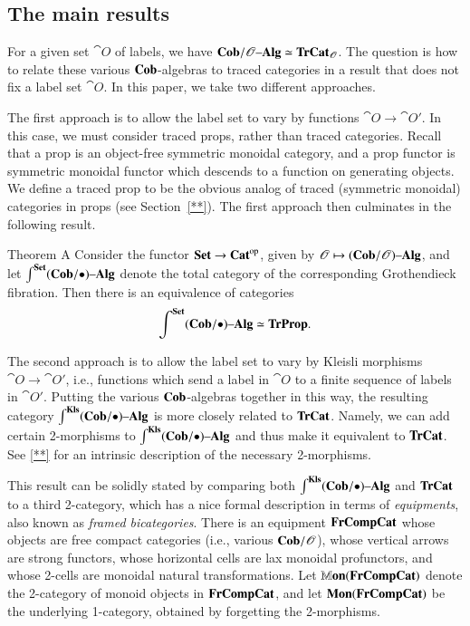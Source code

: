 \documentclass[12pt,oneside,article,draft]{memoir}
\begin{document}
\subsection{The main results}

For a given set $\cat{O}$ of labels, we have $\mathbf{Cob}/\mathscr{O}{\text \textendash}\mathbf{Alg}\simeq\mathbf{TrCat}_{\mathscr{O}}$. 
The question is how to relate these various $\mathbf{Cob}$-algebras to traced categories in a result that does not fix a label set $\cat{O}$.
In this paper, we take two different approaches. 

The first approach is to allow the label set to vary by functions $\cat{O}\to\cat{O'}$. 
In this case, we must consider traced props, rather than traced categories. 
Recall that a prop is an object-free symmetric monoidal category, and a prop functor is symmetric monoidal functor which descends to a function on generating objects. 
We define a traced prop to be the obvious analog of traced (symmetric monoidal) categories in props (see Section~\ref{**}). 
The first approach then culminates in the following result.

\begin{named}{Theorem A}
	Consider the functor $\mathbf{Set}\to{\mathbf{Cat}}^{\text{op}}$, given by $\mathscr{O}\mapsto(\mathbf{Cob}/\mathscr{O}){\text \textendash}\mathbf{Alg}$, and let $\int^{\mathbf{Set}}(\mathbf{Cob}/\bullet){\text \textendash}\mathbf{Alg}$ denote the total category of the corresponding Grothendieck fibration.
	Then there is an equivalence of categories
	$$\int^{\mathbf{Set}}(\mathbf{Cob}/\bullet){\text \textendash}\mathbf{Alg}\simeq\mathbf{TrProp}.$$
\end{named}

The second approach is to allow the label set to vary by Kleisli morphisms $\cat{O}\to\cat{O'}$, i.e., functions which send a label in $\cat{O}$ to a finite sequence of labels in $\cat{O'}$. 
Putting the various $\mathbf{Cob}$-algebras together in this way, the resulting category $\int^{\mathbf{Kls}}(\mathbf{Cob}/\bullet){\text \textendash}\mathbf{Alg}$ is more closely related to $\mathbf{TrCat}$. 
Namely, we can add certain 2-morphisms to $\int^{\mathbf{Kls}}(\mathbf{Cob}/\bullet){\text \textendash}\mathbf{Alg}$ and thus make it equivalent to $\mathbf{TrCat}$. 
See \ref{**} for an intrinsic description of the necessary 2-morphisms.

This result can be solidly stated by comparing both $\int^{\mathbf{Kls}}(\mathbf{Cob}/\bullet){\text \textendash}\mathbf{Alg}$ and $\mathbf{TrCat}$ to a third 2-category, which has a nice formal description in terms of \emph{equipments}, also known as \emph{framed bicategories}. 
There is an equipment $\mathbf{FrCompCat}$ whose objects are free compact categories (i.e., various $\mathbf{Cob}/\mathscr{O}$), whose vertical arrows are strong functors, whose horizontal cells are lax monoidal profunctors, and whose 2-cells are monoidal natural transformations. 
Let $\mathbb{M}\mathbf{on}(\mathbf{FrCompCat})$ denote the 2-category of monoid objects in $\mathbf{FrCompCat}$, and let $\mathbf{Mon}(\mathbf{FrCompCat})$ be the underlying 1-category, obtained by forgetting the 2-morphisms. 
\end{document}
